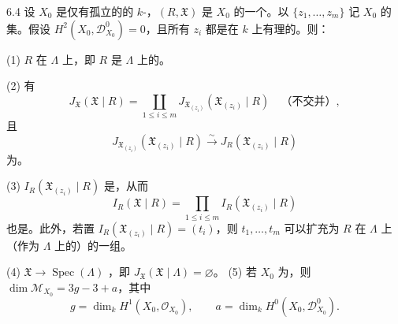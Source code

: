 \begin{SGAresult}{}{6.4}
设 $X_0$ 是仅有孤立的的 $k$-，$(R,\mathfrak X)$ 是 $X_0$ 的一个。以 $\{z_1,\ldots,z_m\}$ 记 $X_0$ 的集。假设 $H^2(X_0,\mathcal D_{X_0}^0)=0$，且所有 $z_i$ 都是在 $k$ 上有理的。则：

(1) $R$ 在 $\Lambda$ 上，即 $R$ 是 $\Lambda$ 上的。

(2) 有
\[
J_{\mathfrak X}(\mathfrak X\mid R)=\coprod_{1\leq i\leq m}
J_{\mathfrak X_{(z_i)}}(\mathfrak X_{(z_i)}\mid R)
\quad\text{（不交并）},
\]
且
\[
J_{\mathfrak X_{(z_i)}}(\mathfrak X_{(z_i)}\mid R)\xrightarrow\sim
J_R(\mathfrak X_{(z_i)}\mid R)
\]
为。

(3) $I_R(\mathfrak X_{(z_i)}\mid R)$ 是，从而
\[
I_R(\mathfrak X\mid R)=\prod_{1\leq i\leq m}I_R(\mathfrak X_{(z_i)}\mid R)
\]
也是。此外，若置 $I_R(\mathfrak X_{(z_i)}\mid R)=(t_i)$，则 $t_1,\ldots,t_m$ 可以扩充为 $R$ 在 $\Lambda$ 上（作为 $\Lambda$ 上的）的一组。

(4) $\mathfrak X\to\operatorname{Spec}(\Lambda)$ ，即 $J_{\mathfrak X}(\mathfrak X\mid\Lambda)=\varnothing$。
(5) 若 $X_0$ 为，则 $\dim\mathcal M_{X_0}=3g-3+a$，其中
\[
g=\dim_k H^1(X_0,\mathcal O_{X_0}),\qquad a=\dim_k H^0(X_0,\mathcal D_{X_0}^0).
\]
\end{SGAresult}
